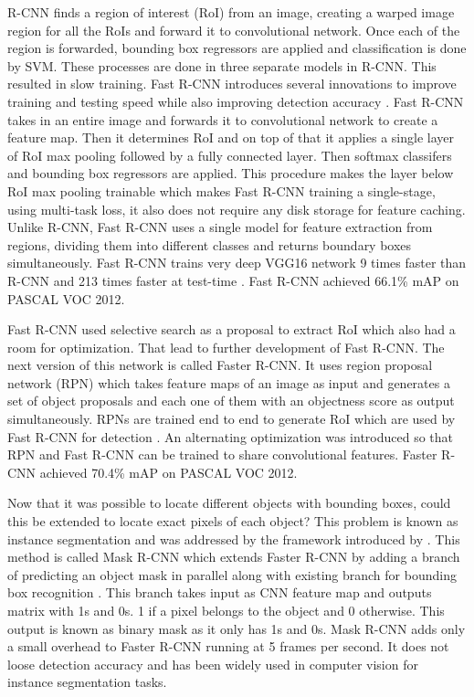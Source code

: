 \documentclass[11pt]{article}
\begin{document}
R-CNN finds a region of interest (RoI) from an image, creating a warped image region for all the RoIs and forward it to convolutional network. Once each of the region is forwarded, bounding box regressors are applied and classification is done by SVM. These processes are done in three separate models in R-CNN. This resulted in slow training. Fast R-CNN introduces several innovations to improve training and testing speed while also improving detection accuracy \cite{girshick2015fast}. Fast R-CNN takes in an entire image and forwards it to convolutional network to create a feature map. Then it determines RoI and on top of that it applies a single layer of RoI max pooling followed by a fully connected layer. Then softmax classifers and bounding box regressors are applied. This procedure makes the layer below RoI max pooling trainable which makes Fast R-CNN training a single-stage, using multi-task loss, it also does not require any disk storage for feature caching. Unlike R-CNN, Fast R-CNN uses a single model for feature extraction from regions, dividing them into different classes and returns boundary boxes simultaneously. Fast R-CNN trains very deep VGG16 network 9 times faster than R-CNN and 213 times faster at test-time \cite{girshick2015fast}. Fast R-CNN achieved 66.1\% mAP on PASCAL VOC 2012.

Fast R-CNN used selective search as a proposal to extract RoI which also had a room for optimization. That lead to further development of Fast R-CNN. The next version of this network is called Faster R-CNN. It uses region proposal network (RPN) which takes feature maps of an image as input and generates a set of object proposals and each one of them with an objectness score as output simultaneously. RPNs are trained end to end to generate RoI which are used by Fast R-CNN for detection \cite{ren2015faster}. An alternating optimization was introduced so that RPN and Fast R-CNN can be trained to share convolutional features. Faster R-CNN achieved 70.4\% mAP on PASCAL VOC 2012.

Now that it was possible to locate different objects with bounding boxes, could this be extended to locate exact pixels of each object? This problem is known as instance segmentation and was addressed by the framework introduced by \cite{he_mask_2017}. This method is called Mask R-CNN which extends Faster R-CNN by adding a branch of predicting an object mask in parallel along with existing branch for bounding box recognition \cite{he_mask_2017}. This branch takes input as CNN feature map and outputs matrix with 1s and 0s. 1 if a pixel belongs to the object and 0 otherwise. This output is known as binary mask as it only has 1s and 0s. Mask R-CNN adds only a small overhead to Faster R-CNN running at 5 frames per second. It does not loose detection accuracy and has been widely used in computer vision for instance segmentation tasks.
\end{document}
